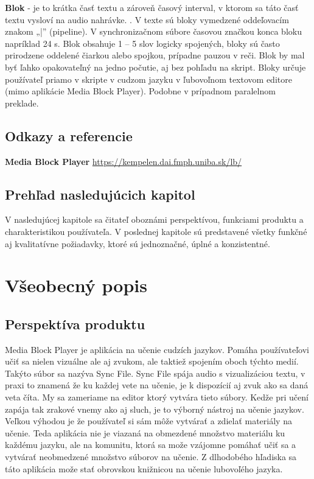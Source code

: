\documentclass{article}
\begin{document}
\textbf{Blok} - je to krátka časť textu a zároveň časový interval, v ktorom sa táto časť textu vysloví na audio nahrávke. . V texte sú bloky vymedzené oddeľovacím znakom „|” (pipeline). V synchronizačnom súbore časovou značkou konca bloku napríklad 24 s.  Blok obsahuje 1 – 5 slov logicky spojených, bloky sú často prirodzene oddelené čiarkou alebo spojkou, prípadne pauzou v reči. Blok by mal byť ľahko opakovateľný na jedno počutie, aj bez pohľadu na skript. Bloky určuje používateľ priamo v skripte v cudzom jazyku v ľubovoľnom textovom editore (mimo aplikácie Media Block Player). Podobne v prípadnom paralelnom preklade.


\subsection{Odkazy a referencie}    
\textbf{Media Block Player}       \url{https://kempelen.dai.fmph.uniba.sk/lb/}


\subsection{Prehľad nasledujúcich kapitol}
V nasledujúcej kapitole sa čitateľ oboznámi perspektívou, funkciami produktu a charakteristikou používateľa. V poslednej kapitole sú predstavené všetky funkčné aj kvalitatívne požiadavky, ktoré sú jednoznačné, úplné a konzistentné.



\section{Všeobecný popis}

\subsection{Perspektíva produktu }
Media Block Player je aplikácia na učenie cudzích jazykov. Pomáha používateľovi učiť sa nielen vizuálne ale aj zvukom, ale taktiež spojením oboch týchto medií. Takýto súbor sa nazýva Sync File. Sync File spája audio s vizualizáciou textu, v praxi to znamená že ku každej vete na učenie, je k dispozícií aj zvuk ako sa daná veta číta. My sa zameriame na editor ktorý vytvára tieto súbory. Kedže pri učení zapája tak zrakové vnemy ako aj sluch, je to výborný nástroj na učenie jazykov. Veľkou výhodou je že používateľ si sám môže vytvárať a zdielať materiály na učenie. Teda aplikácia nie je viazaná na obmezdené množstvo materiálu ku každému jazyku, ale na komunitu, ktorá sa može vzájomne pomáhať učiť sa a vytvárať neobmedzené množstvo súborov na učenie. Z dlhodobého hľadiska sa táto aplikácia može stať obrovskou knižnicou na učenie lubovoľého jazyka.
\end{document}
